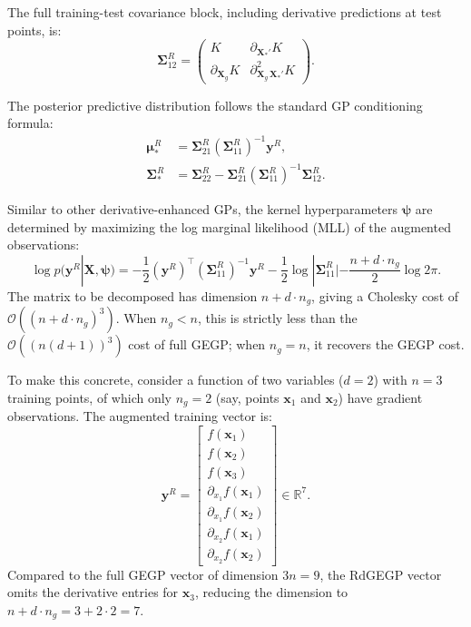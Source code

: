 \documentclass[12pt]{article}
\begin{document}
The full training-test covariance block, including derivative predictions at test points, is:
\begin{equation}
	\label{eqn:rdgegp_S12_full}
	\boldsymbol{\Sigma}^{R}_{12} =
	\begin{pmatrix}
		K & \partial_{\mathbf{X}_*'} K \\
		\partial_{\mathbf{X}_g} K & \partial^2_{\mathbf{X}_g\,\mathbf{X}_*'} K
	\end{pmatrix}.
\end{equation}

The posterior predictive distribution follows the standard GP conditioning formula:
\begin{equation}
	\label{eqn:rdgegp_posterior}
	\begin{split}
		\boldsymbol{\mu}^{R}_{*} &= \boldsymbol{\Sigma}^{R}_{21} \left(\boldsymbol{\Sigma}^{R}_{11}\right)^{-1} \mathbf{y}^{R}, \\
		\boldsymbol{\Sigma}^{R}_{*} &= \boldsymbol{\Sigma}^{R}_{22} - \boldsymbol{\Sigma}^{R}_{21} \left(\boldsymbol{\Sigma}^{R}_{11}\right)^{-1} \boldsymbol{\Sigma}^{R}_{12}.
	\end{split}
\end{equation}

Similar to other derivative-enhanced GPs, the kernel hyperparameters $\boldsymbol{\psi}$ are determined by maximizing the log marginal likelihood (MLL) of the augmented observations:
\begin{equation}
	\label{eqn:rdgegp_mll}
	\log p(\mathbf{y}^{R}|\mathbf{X}, \boldsymbol{\psi}) = -\frac{1}{2} \left(\mathbf{y}^{R}\right)^\top \left(\boldsymbol{\Sigma}^{R}_{11}\right)^{-1} \mathbf{y}^{R} - \frac{1}{2}\log|\boldsymbol{\Sigma}^{R}_{11}| - \frac{n + d \cdot n_g}{2}\log 2\pi.
\end{equation}
The matrix to be decomposed has dimension $n + d \cdot n_g$, giving a Cholesky cost of $\mathcal{O}((n + d \cdot n_g)^3)$. When $n_g < n$, this is strictly less than the $\mathcal{O}((n(d+1))^3)$ cost of full GEGP; when $n_g = n$, it recovers the GEGP cost.

To make this concrete, consider a function of two variables ($d = 2$) with $n = 3$ training points, of which only $n_g = 2$ (say, points $\mathbf{x}_1$ and $\mathbf{x}_2$) have gradient observations. The augmented training vector is:
\begin{equation}
	\label{eqn:rdgegp_aug_vectors_2d}
	\mathbf{y}^{R} = \begin{bmatrix} f(\mathbf{x}_1) \\ f(\mathbf{x}_2) \\ f(\mathbf{x}_3) \\ \partial_{x_1} f(\mathbf{x}_1) \\ \partial_{x_1} f(\mathbf{x}_2) \\ \partial_{x_2} f(\mathbf{x}_1) \\ \partial_{x_2} f(\mathbf{x}_2) \end{bmatrix} \in \mathbb{R}^{7}.
\end{equation}
Compared to the full GEGP vector of dimension $3n = 9$, the RdGEGP vector omits the derivative entries for $\mathbf{x}_3$, reducing the dimension to $n + d \cdot n_g = 3 + 2 \cdot 2 = 7$.
\end{document}
